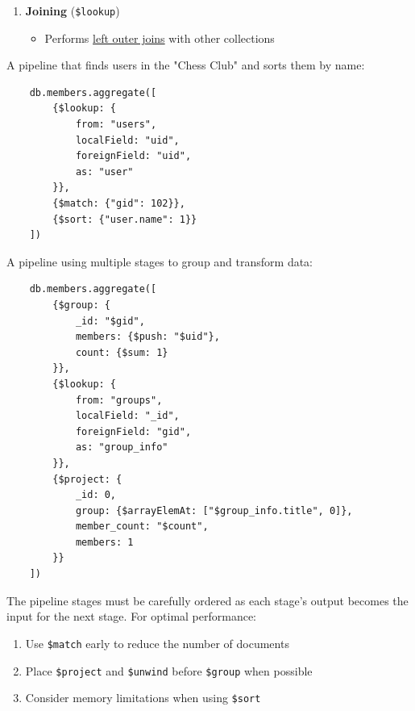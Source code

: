 \begin{enumerate}
  \item \textbf{Joining} (\texttt{\$lookup})
  \begin{itemize}
      \item Performs \hyperref[def:left-outer-join-2]{left outer joins} with other collections
  \end{itemize}
\end{enumerate}

\begin{example}
  \label{ex:basic-pipeline}
  A pipeline that finds users in the "Chess Club" and sorts them by name:
  \begin{lstlisting}
    db.members.aggregate([
        {$lookup: {
            from: "users",
            localField: "uid",
            foreignField: "uid",
            as: "user"
        }},
        {$match: {"gid": 102}},
        {$sort: {"user.name": 1}}
    ])
  \end{lstlisting}
\end{example}

\begin{example}
  \label{ex:complex-pipeline}
  A pipeline using multiple stages to group and transform data:
  \begin{lstlisting}
    db.members.aggregate([
        {$group: {
            _id: "$gid",
            members: {$push: "$uid"},
            count: {$sum: 1}
        }},
        {$lookup: {
            from: "groups",
            localField: "_id",
            foreignField: "gid",
            as: "group_info"
        }},
        {$project: {
            _id: 0,
            group: {$arrayElemAt: ["$group_info.title", 0]},
            member_count: "$count",
            members: 1
        }}
    ])
  \end{lstlisting}
\end{example}

The pipeline stages must be carefully ordered as each stage's output becomes the input for the next stage. For optimal performance:
\begin{enumerate}
  \item Use \texttt{\$match} early to reduce the number of documents
  \item Place \texttt{\$project} and \texttt{\$unwind} before \texttt{\$group} when possible
  \item Consider memory limitations when using \texttt{\$sort}
\end{enumerate}

